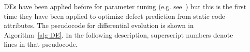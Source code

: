 DEs have been applied before for   parameter tuning (e.g. see~\cite{omran2005differential, chiha2012tuning}) but this is the first time they have been applied to
optimize defect prediction from static code attributes.  
The pseudocode for differential evolution is shown in Algorithm~\ref{alg:DE}.
In the following description, 
    superscript numbers denote lines in that pseudocode.

 




